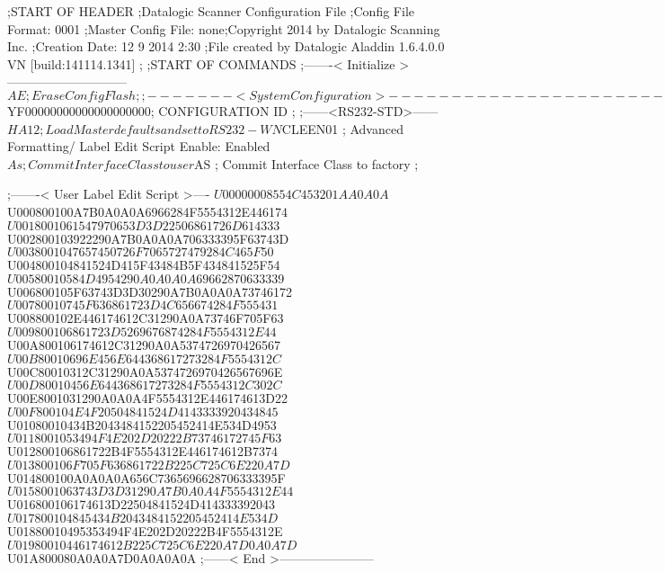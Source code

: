 ;START OF HEADER
;Datalogic Scanner Configuration File
;Config File Format: 0001
;Master Config File: none;Copyright 2014 by Datalogic Scanning Inc.
;Creation Date: 12 9 2014 2:30
;File created by Datalogic Aladdin 1.6.4.0.0 VN [build:141114.1341]
;
;START OF COMMANDS
;-------< Initialize >-----------------------------
$AE                 ; Erase Config Flash
;
;-------< System Configuration >-------------------------------
$YF00000000000000000000; CONFIGURATION ID
;
;------<RS232-STD>------
$HA12               ; Load Master defaults and set to RS232-WN
$CLEEN01            ; Advanced Formatting/ Label Edit Script Enable: Enabled
$As                 ; Commit Interface Class to user
$AS                 ; Commit Interface Class to factory
;

;-------< User Label Edit Script >----
$U00000008554C453201AA0A0A
$U000800100A7B0A0A0A6966284F5554312E446174
$U0018001061547970653D3D22506861726D614333
$U002800103922290A7B0A0A0A706333395F63743D
$U0038001047657450726F7065727479284C465F50
$U004800104841524D415F43484B5F434841525F54
$U00580010584D4954290A0A0A0A69662870633339
$U006800105F63743D3D30290A7B0A0A0A73746172
$U00780010745F636861723D4C656674284F555431
$U008800102E446174612C31290A0A73746F705F63
$U009800106861723D5269676874284F5554312E44
$U00A800106174612C31290A0A5374726970426567
$U00B80010696E456E644368617273284F5554312C
$U00C80010312C31290A0A5374726970426567696E
$U00D80010456E644368617273284F5554312C302C
$U00E8001031290A0A0A4F5554312E446174613D22
$U00F800104E4F20504841524D4143333920434845
$U01080010434B2043484152205452414E534D4953
$U0118001053494F4E202D20222B73746172745F63
$U012800106861722B4F5554312E446174612B7374
$U013800106F705F636861722B225C725C6E220A7D
$U014800100A0A0A0A656C7365696628706333395F
$U0158001063743D3D31290A7B0A0A4F5554312E44
$U016800106174613D22504841524D414333392043
$U017800104845434B2043484152205452414E534D
$U01880010495353494F4E202D20222B4F5554312E
$U01980010446174612B225C725C6E220A7D0A0A7D
$U01A800080A0A0A7D0A0A0A0A
;------< End >-----------------------
